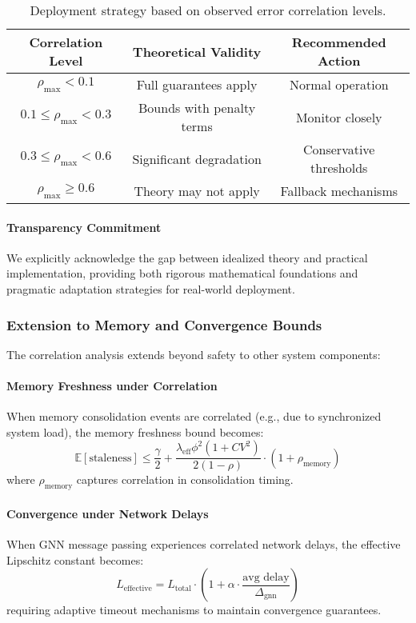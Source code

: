 \documentclass{article}
\begin{document}
\begin{table}[H]
\centering
\caption{Deployment strategy based on observed error correlation levels.}
\label{tab:deployment-strategy}
\begin{tabular}{|c|c|c|}
\hline
\textbf{Correlation Level} & \textbf{Theoretical Validity} & \textbf{Recommended Action} \\
\hline
$\rho_{\max} < 0.1$ & Full guarantees apply & Normal operation \\
$0.1 \leq \rho_{\max} < 0.3$ & Bounds with penalty terms & Monitor closely \\
$0.3 \leq \rho_{\max} < 0.6$ & Significant degradation & Conservative thresholds \\
$\rho_{\max} \geq 0.6$ & Theory may not apply & Fallback mechanisms \\
\hline
\end{tabular}
\end{table}

\paragraph{Transparency Commitment} We explicitly acknowledge the gap between idealized theory and practical implementation, providing both rigorous mathematical foundations and pragmatic adaptation strategies for real-world deployment.

\subsubsection{Extension to Memory and Convergence Bounds}

The correlation analysis extends beyond safety to other system components:

\paragraph{Memory Freshness under Correlation}
When memory consolidation events are correlated (e.g., due to synchronized system load), the memory freshness bound becomes:
\begin{equation}
\mathbb{E}[\text{staleness}] \leq \frac{\gamma}{2} + \frac{\lambda_{\text{eff}}\phi^2(1 + CV^2)}{2(1-\rho)} \cdot (1 + \rho_{\text{memory}})
\end{equation}
where $\rho_{\text{memory}}$ captures correlation in consolidation timing.

\paragraph{Convergence under Network Delays}
When GNN message passing experiences correlated network delays, the effective Lipschitz constant becomes:
\begin{equation}
L_{\text{effective}} = L_{\text{total}} \cdot \left(1 + \alpha \cdot \frac{\text{avg delay}}{\Delta_{\text{gnn}}}\right)
\end{equation}
requiring adaptive timeout mechanisms to maintain convergence guarantees.
\end{document}
